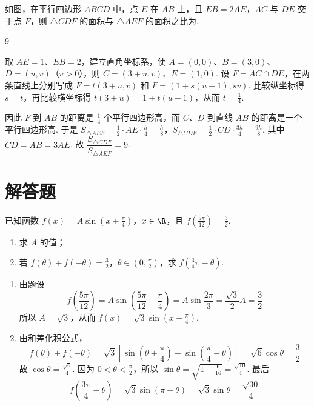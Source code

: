 \begin{problem}
如图，在平行四边形 \(ABCD\) 中，点 \(E\) 在 \(AB\) 上，且 \(EB = 2AE\)，\(AC\) 与 \(DE\) 交于点 \(F\)，则 \(\triangle CDF\) 的面积与 \(\triangle AEF\) 的面积之比为\fillinblank{}.

\end{problem}

\begin{answer}
9
\end{answer}

\begin{solution}
取 \(AE=1\)、\(EB=2\)，建立直角坐标系，使 \(A=(0,0)\)、\(B=(3,0)\)、\(D=(u,v)\)（\(v>0\)），则 \(C=(3+u,v)\)、\(E=(1,0)\). 设 \(F=AC\cap DE\)，在两条直线上分别写成
\(F=t(3+u,v)\) 和 \(F=(1+s(u-1),sv)\). 比较纵坐标得 \(s=t\)，再比较横坐标得
\(t(3+u)=1+t(u-1)\)，从而 \(t=\frac14\).

因此 \(F\) 到 \(AB\) 的距离是 \(\frac14\) 个平行四边形高，而 \(C\)、\(D\) 到直线 \(AB\) 的距离是一个平行四边形高. 于是 \(S_{\triangle AEF}=\frac12\cdot AE\cdot\frac{h}{4}=\frac h8\)，\(S_{\triangle CDF}=\frac12\cdot CD\cdot\frac{3h}{4}=\frac{9h}{8}\).
其中 \(CD=AB=3AE\). 故
\(\dfrac{S_{\triangle CDF}}{S_{\triangle AEF}}=9\).
\end{solution}

\section{解答题}

\begin{problem}
已知函数 \(f(x) = A \sin \left( x + \frac{\pi}{4} \right)\)，\(x \in \R\)，且 \( f\left( \frac{5\pi}{12} \right) = \frac{3}{2} \).

\begin{enumerate}
\item 求 \(A\) 的值；
\item 若 \(f(\theta) + f(-\theta) = \frac{3}{2}\)，\(\theta \in \left(0, \frac{\pi}{2}\right)\)，求 \( f\left(\frac{3}{4}\pi - \theta\right) \).
\end{enumerate}
\end{problem}

\begin{solution}
\begin{enumerate}
\item 由题设
\[
f\left(\frac{5\pi}{12}\right)=A\sin\left(\frac{5\pi}{12}+\frac{\pi}{4}\right)=A\sin\frac{2\pi}{3}=\frac{\sqrt{3}}{2}A=\frac32
\]
所以 \(A=\sqrt3\)，从而 \(f(x)=\sqrt3\sin\left(x+\frac\pi4\right)\).

\item 由和差化积公式，
\[
f(\theta)+f(-\theta)
=\sqrt3\left[\sin\left(\theta+\frac\pi4\right)+\sin\left(\frac\pi4-\theta\right)\right]
=\sqrt6\cos\theta=\frac32
\]
故 \(\cos\theta=\frac{\sqrt6}{4}\). 因为 \(0<\theta<\frac\pi2\)，所以
\(\sin\theta=\sqrt{1-\frac{6}{16}}=\frac{\sqrt{10}}{4}\). 最后
\[
f\left(\frac{3\pi}{4}-\theta\right)
=\sqrt3\sin(\pi-\theta)
=\sqrt3\sin\theta
=\frac{\sqrt{30}}{4}
\]
\end{enumerate}
\end{solution}

